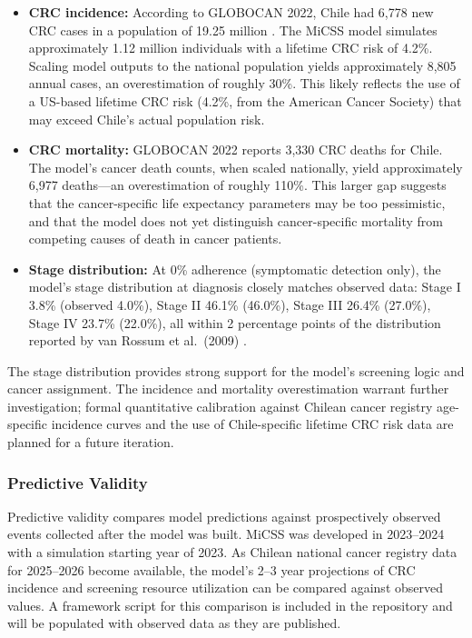 \documentclass[sn-mathphys-num]{sn-jnl}%
\theoremstyle{thmstyleone}%
\theoremstyle{thmstyletwo}%
\theoremstyle{thmstylethree}%
\begin{document}
\begin{itemize}
    \item \textbf{CRC incidence:} According to GLOBOCAN 2022, Chile had 6,778 new CRC cases in a population of 19.25 million \cite{ferlay_globocan_2024}. The MiCSS model simulates approximately 1.12 million individuals with a lifetime CRC risk of 4.2\%. Scaling model outputs to the national population yields approximately 8,805 annual cases, an overestimation of roughly 30\%. This likely reflects the use of a US-based lifetime CRC risk (4.2\%, from the American Cancer Society) that may exceed Chile's actual population risk.
    \item \textbf{CRC mortality:} GLOBOCAN 2022 reports 3,330 CRC deaths for Chile. The model's cancer death counts, when scaled nationally, yield approximately 6,977 deaths---an overestimation of roughly 110\%. This larger gap suggests that the cancer-specific life expectancy parameters may be too pessimistic, and that the model does not yet distinguish cancer-specific mortality from competing causes of death in cancer patients.
    \item \textbf{Stage distribution:} At 0\% adherence (symptomatic detection only), the model's stage distribution at diagnosis closely matches observed data: Stage I 3.8\% (observed 4.0\%), Stage II 46.1\% (46.0\%), Stage III 26.4\% (27.0\%), Stage IV 23.7\% (22.0\%), all within 2 percentage points of the distribution reported by van Rossum et al.\ (2009) \cite{van_rossum_earlier_2009}.
\end{itemize}

The stage distribution provides strong support for the model's screening logic and cancer assignment. The incidence and mortality overestimation warrant further investigation; formal quantitative calibration against Chilean cancer registry age-specific incidence curves and the use of Chile-specific lifetime CRC risk data are planned for a future iteration.

\subsubsection{Predictive Validity}

Predictive validity compares model predictions against prospectively observed events collected after the model was built. MiCSS was developed in 2023--2024 with a simulation starting year of 2023. As Chilean national cancer registry data for 2025--2026 become available, the model's 2--3 year projections of CRC incidence and screening resource utilization can be compared against observed values. A framework script for this comparison is included in the repository and will be populated with observed data as they are published.
\end{document}
